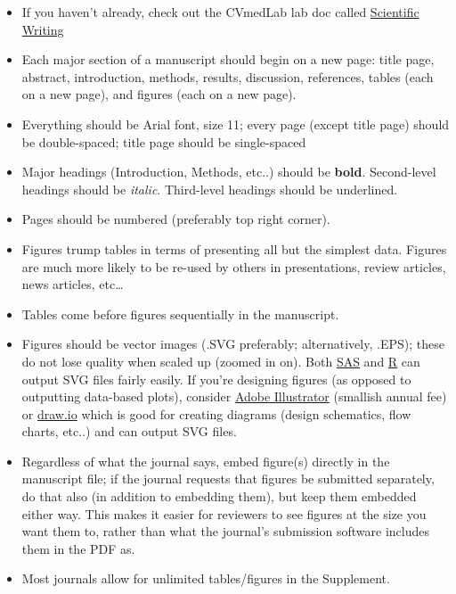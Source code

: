 \documentclass[
  letterpaper,
  DIV=11,
  numbers=noendperiod]{scrreprt}
\begin{document}
\begin{itemize}
\item
  If you haven't already, check out the CVmedLab lab doc called
  \href{https://cvmedlab.org/labdocs/writing.html}{Scientific Writing}
\item
  Each major section of a manuscript should begin on a new page: title
  page, abstract, introduction, methods, results, discussion,
  references, tables (each on a new page), and figures (each on a new
  page).
\item
  Everything should be Arial font, size 11; every page (except title
  page) should be double-spaced; title page should be single-spaced
\item
  Major headings (Introduction, Methods, etc..) should be \textbf{bold}.
  Second-level headings should be \emph{italic}. Third-level headings
  should be underlined.
\item
  Pages should be numbered (preferably top right corner).
\item
  Figures trump tables in terms of presenting all but the simplest data.
  Figures are much more likely to be re-used by others in presentations,
  review articles, news articles, etc\ldots{}
\item
  Tables come before figures sequentially in the manuscript.
\item
  Figures should be vector images (.SVG preferably; alternatively,
  .EPS); these do not lose quality when scaled up (zoomed in on). Both
  \href{https://documentation.sas.com/doc/en/pgmsascdc/9.4_3.5/lrcon/n0ezld96mjxs08n1lvoj5mtb4opl.htm}{SAS}
  and \href{https://ggplot2.tidyverse.org/reference/ggsave.html}{R} can
  output SVG files fairly easily. If you're designing figures (as
  opposed to outputting data-based plots), consider
  \href{https://info.apps.ufl.edu/adobeatufapps/}{Adobe Illustrator}
  (smallish annual fee) or \href{https://app.diagrams.net/}{draw.io}
  which is good for creating diagrams (design schematics, flow charts,
  etc..) and can output SVG files.
\item
  Regardless of what the journal says, embed figure(s) directly in the
  manuscript file; if the journal requests that figures be submitted
  separately, do that also (in addition to embedding them), but keep
  them embedded either way. This makes it easier for reviewers to see
  figures at the size you want them to, rather than what the journal's
  submission software includes them in the PDF as.
\item
  Most journals allow for unlimited tables/figures in the Supplement.

\end{itemize}
\end{document}
